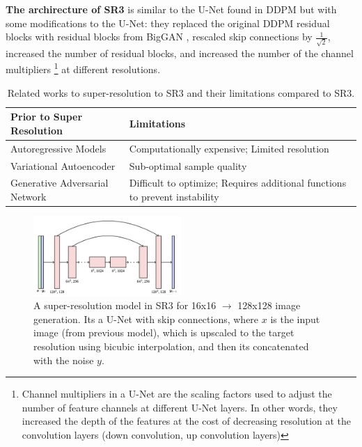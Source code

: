 \textbf{The archirecture of SR3} is similar to the U-Net found in DDPM but with some modifications to the U-Net: they replaced the original DDPM residual blocks with residual blocks from BigGAN \cite{biggan_deep}, rescaled skip connections by $\frac{1}{\sqrt{2}}$, increased the number of residual blocks, and increased the number of the channel multipliers \footnote{Channel multipliers in a U-Net are the scaling factors used to adjust the number of feature channels at different U-Net layers. In other words, they increased the depth of the features at the cost of decreasing resolution at the convolution layers (down convolution, up convolution layers)} at different resolutions.

\begin{table}[h!]
    \centering
    \begin{tabular}{|l|m{8cm}|}
        \hline
        \textbf{Prior to Super Resolution} & \textbf{Limitations} \\ \hline
        Autoregressive Models           & Computationally expensive; Limited resolution \\ \hline
        Variational Autoencoder         & Sub-optimal sample quality \\ \hline
        Generative Adversarial Network  & Difficult to optimize; Requires additional functions to prevent instability \\ \hline
    \end{tabular}
    \caption{Related works to super-resolution to SR3 and their limitations compared to SR3.}
\end{table}


\begin{figure}
    \centering
    \includegraphics[width=0.5\textwidth]{images/imagen/sr3_architecture.png}
    \caption{A super-resolution model in SR3 for 16x16 $\rightarrow$ 128x128 image generation. Its a U-Net with skip connections, where $x$ is the input image (from previous model), which is upscaled to the target resolution using bicubic interpolation, and then its concatenated with the noise $y$.}
    \label{fig:sr3_architecture}
\end{figure}















